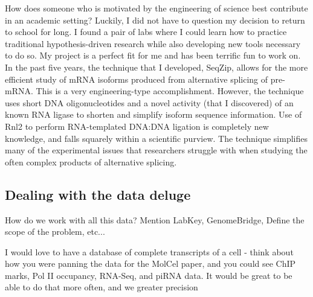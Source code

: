     How does someone who is motivated by the engineering of science best contribute in an academic setting? Luckily, I did not have to question my decision to return to school for long. I found a pair of labs where I could learn how to practice traditional hypothesis-driven research while also developing new tools necessary to do so. My project is a perfect fit for me and has been terrific fun to work on. In the past five years, the technique that I developed, SeqZip, allows for the more efficient study of  mRNA isoforms produced from alternative splicing of pre-mRNA. This is a very engineering-type accomplishment. However, the technique uses short DNA oligonucleotides and a novel activity (that I discovered) of an known RNA ligase to shorten and simplify isoform sequence information. Use of Rnl2 to perform RNA-templated DNA:DNA ligation is completely new knowledge, and falls squarely within a scientific purview. The technique simplifies many of the experimental issues that researchers struggle with when studying the often complex products of alternative splicing.

  \subsection{Dealing with the data deluge}

    How do we work with all this data? Mention LabKey, GenomeBridge, Define the scope of the problem, etc...

    I would love to have a database of complete transcripts of a cell - think about how you were panning the data for the MolCel paper, and you could see ChIP marks, Pol II occupancy, RNA-Seq, and piRNA data. It would be great to be able to do that more often, and we greater precision
